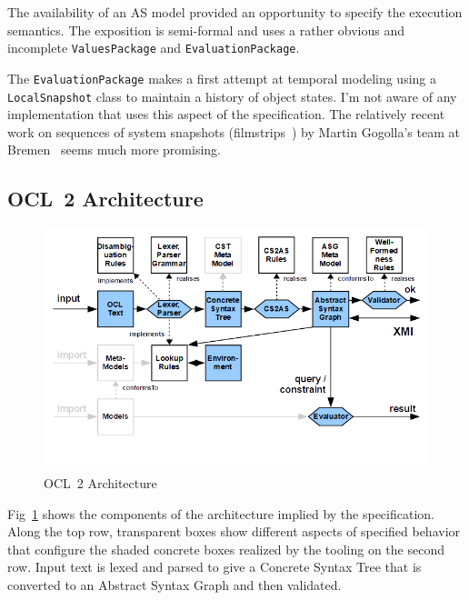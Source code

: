 \documentclass{jot}
\begin{document}
The availability of an AS model provided an opportunity to specify the execution semantics. The exposition is semi-formal and uses a rather obvious and incomplete \verb$ValuesPackage$ and \verb$EvaluationPackage$. %

The \verb$EvaluationPackage$ makes a first attempt at temporal modeling using a \verb$LocalSnapshot$ class to maintain a history of object states. I'm not aware of any implementation that uses this aspect of the specification. The relatively recent work on sequences of system snapshots (filmstrips~\cite{Desai}) by Martin Gogolla's team at Bremen~\cite{USE} seems much more promising.

\subsection{OCL~2 Architecture}

\begin{figure}
	\begin{center}
		\includegraphics[width=4.5in]{OCL2Architecture.png}
	\end{center}
    \vspace{-40pt}
	\caption{OCL~2 Architecture}
	\label{fig:OCL2Architecture}
\end{figure}

Fig~\ref{fig:OCL2Architecture} shows the components of the architecture implied by the specification. Along the top row, transparent boxes show different aspects of specified behavior that configure the shaded concrete boxes realized by the tooling on the second row. Input text is lexed and parsed to give a Concrete Syntax Tree that is converted to an Abstract Syntax Graph and then validated.
\end{document}
